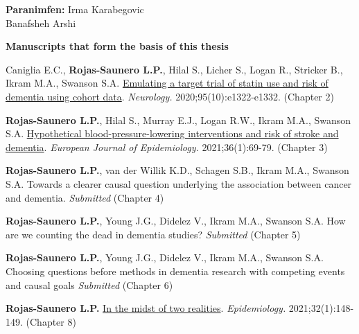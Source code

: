 \vspace*{\fill}
 
\textbf{Paranimfen:} \hspace{2.5mm}Irma Karabegovic   \\ 
\phantom{Paranimfen} \hspace{6.5mm}Banafsheh Arshi    
                    
\newpage  
\thispagestyle{empty}
\textbf{Manuscripts that form the basis of this thesis}

Caniglia E.C., \textbf{Rojas-Saunero L.P.}, Hilal S., Licher S., Logan
R., Stricker B., Ikram M.A., Swanson S.A.
\href{https://pubmed.ncbi.nlm.nih.gov/32753444/}{Emulating a target
trial of statin use and risk of dementia using cohort data}.
\emph{Neurology.} 2020;95(10):e1322-e1332. (Chapter 2)

\textbf{Rojas-Saunero L.P.}, Hilal S., Murray E.J., Logan R.W., Ikram
M.A., Swanson S.A.
\href{https://pubmed.ncbi.nlm.nih.gov/33247419/}{Hypothetical
blood-pressure-lowering interventions and risk of stroke and dementia}.
\emph{European Journal of Epidemiology.} 2021;36(1):69-79. (Chapter 3)

\textbf{Rojas-Saunero L.P.}, van der Willik K.D., Schagen S.B., Ikram
M.A., Swanson S.A. Towards a clearer causal question underlying the
association between cancer and dementia. \emph{Submitted} (Chapter 4)

\textbf{Rojas-Saunero L.P.}, Young J.G., Didelez V., Ikram M.A., Swanson
S.A. How are we counting the dead in dementia studies? \emph{Submitted}
(Chapter 5)

\textbf{Rojas-Saunero L.P.}, Young J.G., Didelez V., Ikram M.A., Swanson
S.A. Choosing questions before methods in dementia research with
competing events and causal goals \emph{Submitted} (Chapter 6)

\textbf{Rojas-Saunero L.P.}
\href{https://pubmed.ncbi.nlm.nih.gov/33122553/}{In the midst of two
realities}. \emph{Epidemiology.} 2021;32(1):148-149. (Chapter 8)

\newpage
\thispagestyle{empty}
\tableofcontents
